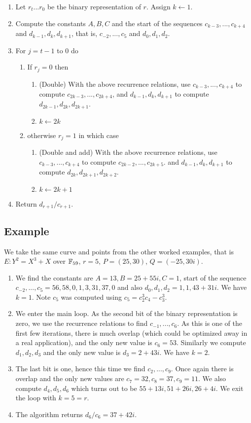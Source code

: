 \begin{enumerate}
\item
Let $r_t ... r_0$ be the binary representation of $r$.
Assign $k \leftarrow 1$.
\item
Compute the constants $A, B, C$ and the start of the sequences
$c_{k-3},...,c_{k+4}$ and $d_{k-1}, d_k, d_{k+1}$, that is,
$c_{-2}, ..., c_{5}$ and $ d_0, d_1, d_2$.
\item
For $j = t-1$ to $0$ do
\begin{enumerate}
\item
If $r_j = 0$ then
\begin{enumerate}
\item
(Double)
With the above recurrence relations,
use $c_{k-3}, ..., c_{k+4}$ to compute $c_{2k-3},...,c_{2k+4}$,
and $d_{k-1}, d_k, d_{k+1}$ to compute $d_{2k-1}, d_{2k}, d_{2k+1}$.
\item
$k \leftarrow 2k$
\end{enumerate}
\item
otherwise $r_j = 1$ in which case
\begin{enumerate}
\item
(Double and add)
With the above recurrence relations,
use $c_{k-3}, ..., c_{k+4}$ to compute $c_{2k-2},...,c_{2k+5}$.
and $d_{k-1}, d_k, d_{k+1}$ to compute $d_{2k}, d_{2k+1}, d_{2k+2}$.
\item
$k \leftarrow 2k + 1$
\end{enumerate}
\end{enumerate}
\item
Return $d_{r+1}/c_{r+1}$.
\end{enumerate}
\subsection {Example}
We take the same curve and points from the other worked examples, that is
$E : Y^2 = X^3 + X$ over $\mathbb{F}_{59}$, $r = 5$,
$P = (25, 30)$, $Q = (-25, 30i)$.

\begin{enumerate}
\item
We find the constants are $A = 13, B = 25+55i, C = 1$,
start of the sequence $c_{-2}, ..., c_5 = 
56, 58, 0, 1, 3, 31, 37, 0$ and also $d_0, d_1, d_2 = 1, 1, 43+31i$.
We have $k = 1$. Note $c_5$ was computed using
$c_5 = c_2^3 c_4 - c_3^3$.
\item
We enter the main loop. As the second bit of the binary representation is
zero, we use the recurrence relations to find
$c_{-1}, ..., c_6$. As this is one of the first few iterations,
there is much overlap (which could be optimized away
in a real application), and the only new value is $c_6 = 53$. Similarly
we compute $d_1,d_2,d_3$ and the only new value is $d_3 = 2+43i$.
We have $k = 2$.
\item
The last bit is one, hence this time we find
$c_2, ..., c_9$. Once again there is overlap and the only new values
are $c_7 = 32, c_8 = 37, c_9 = 11$.
We also compute $d_4, d_5, d_6$ which turns out to be $55+13i, 51+26i, 26+4i$.
We exit the loop with $k = 5 = r$.
\item
The algorithm returns $d_6/c_6 = 37+42i$.
\end{enumerate}

